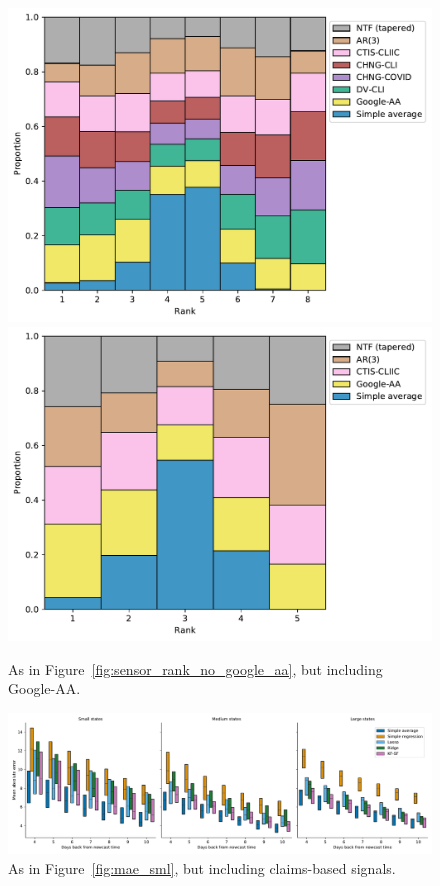 \documentclass[sts]{imsart}
\theoremstyle{plain}
\theoremstyle{definition}
\theoremstyle{remark}
\begin{document}
\begin{appendix}
\begin{figure}[tb]
\centering
\includegraphics[width=0.975\linewidth]{./figures/rankplot_claims.pdf}
\includegraphics[width=0.975\linewidth]{./figures/rankplot_no_claims.pdf}
\caption{As in Figure~\ref{fig:sensor_rank_no_google_aa}, but including Google-AA.}
\label{fig:sensor_rank}
\end{figure}

\begin{figure}[tb]
\centering
\includegraphics[width=0.95\linewidth]{./figures/boxenplot_claims.pdf}
\caption{As in Figure~\ref{fig:mae_sml}, but including claims-based signals.}
\label{fig:mae_sml_claims}
\end{figure}


\end{appendix}
\end{document}
